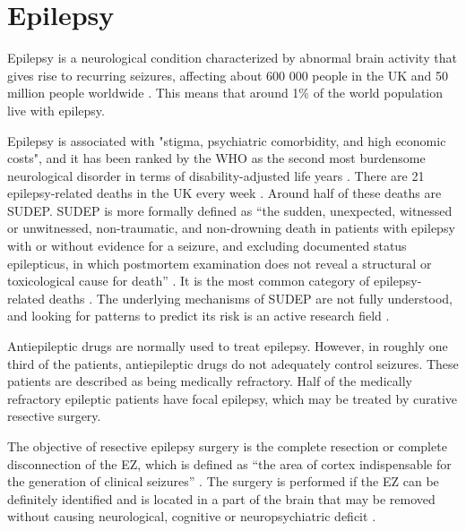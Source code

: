 \section{Epilepsy}

Epilepsy is a neurological condition characterized by abnormal brain activity that gives rise to recurring seizures, affecting about 600 000 people in the UK and 50 million people worldwide \cite{nice_epilepsies_2012,fiest_prevalence_2017}.
This means that around 1\% of the world population live with epilepsy.

Epilepsy is associated with "stigma, psychiatric comorbidity, and high economic costs", and it has been ranked by the \ac{WHO} as the second most burdensome neurological disorder in terms of disability-adjusted life years \cite{fiest_prevalence_2017}.
There are 21 epilepsy-related deaths in the UK every week%
.
Around half of these deaths are \ac{SUDEP}.  %
\ac{SUDEP} is more formally defined as ``the sudden, unexpected, witnessed or unwitnessed, non-traumatic, and non-drowning death in patients with epilepsy with or without evidence for a seizure, and excluding documented status epilepticus, in which postmortem examination does not reveal a structural or toxicological cause for death'' \cite{nashef_sudden_1997}.
It is the most common category of epilepsy-related deaths \cite{devinsky_sudden_2016}.
The underlying mechanisms of \ac{SUDEP} are not fully understood, and looking for patterns to predict its risk is an active research field \cite{so_what_2008,alexandre_risk_2015,vilella_association_2021,jha_sudden_2021}.

Antiepileptic drugs are normally used to treat epilepsy.
However, in roughly one third of the patients, antiepileptic drugs do not adequately control seizures.
These patients are described as being medically refractory.
Half of the medically refractory epileptic patients have focal epilepsy, which may be treated by curative resective surgery.



The objective of resective epilepsy surgery is the complete resection or complete disconnection of the \ac{EZ}, which is defined as ``the area of cortex indispensable for the generation of clinical seizures'' \cite{rosenow_presurgical_2001}.
The surgery is performed if the \ac{EZ} can be definitely identified and is located in a part of the brain that may be removed without causing neurological, cognitive or neuropsychiatric deficit \cite{jobst_resective_2015}.

